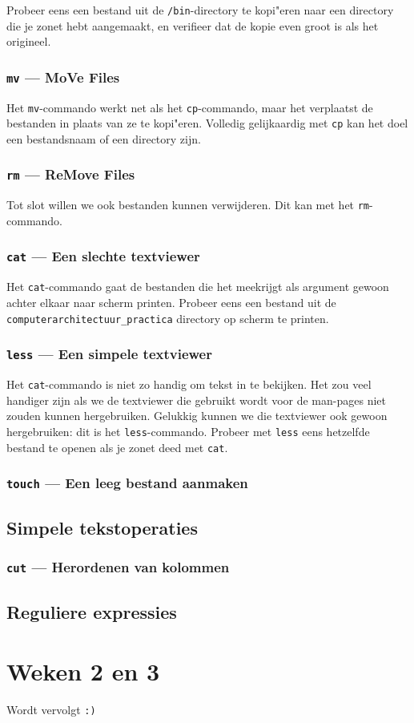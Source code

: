 \documentclass[a4paper,twoside,openany]{memoir}
\begin{document}
Probeer eens een bestand uit de \verb!/bin!-directory te kopi"eren naar een directory die je zonet hebt aangemaakt, en verifieer dat de kopie even groot is als het origineel.

\section{\texttt{mv} --- MoVe Files}

Het \verb!mv!-commando werkt net als het \verb!cp!-commando, maar het verplaatst de bestanden in plaats van ze te kopi"eren. Volledig gelijkaardig met \verb!cp! kan het doel een bestandsnaam of een directory zijn.

\section{\texttt{rm} --- ReMove Files}

Tot slot willen we ook bestanden kunnen verwijderen. Dit kan met het \verb!rm!-commando.

\section{\texttt{cat} --- Een slechte textviewer}
Het \verb!cat!-commando gaat de bestanden die het meekrijgt als argument gewoon achter elkaar naar scherm printen. Probeer eens een bestand uit de \verb!computerarchitectuur_practica! directory op scherm te printen.

\section{\texttt{less} --- Een simpele textviewer}
Het \verb!cat!-commando is niet zo handig om tekst in te bekijken. Het zou veel handiger zijn als we de textviewer die gebruikt wordt voor de man-pages niet zouden kunnen hergebruiken. Gelukkig kunnen we die textviewer ook gewoon hergebruiken: dit is het \verb!less!-commando. Probeer met \verb!less! eens hetzelfde bestand te openen als je zonet deed met \verb!cat!.

\section{\texttt{touch} --- Een leeg bestand aanmaken}


\chapter{Simpele tekstoperaties}

\section{\texttt{cut} --- Herordenen van kolommen}


\chapter{Reguliere expressies}

\part{Weken 2 en 3}
Wordt vervolgt \verb!:)!
\end{document}
